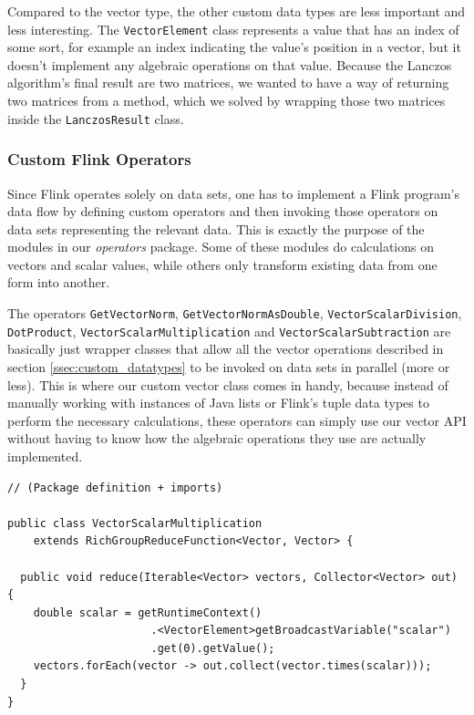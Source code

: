 
Compared to the vector type, the other custom data types are less important and
less interesting. The \texttt{VectorElement} class represents a value that has
an index of some sort, for example an index indicating the value's position in
a vector, but it doesn't implement any algebraic operations on that value.
Because the Lanczos algorithm's final result are two matrices, we wanted to
have a way of returning two matrices from a method, which we solved by wrapping
those two matrices inside the \texttt{LanczosResult} class.


\subsubsection{Custom Flink Operators}
\label{ssec:custom_operators}

Since Flink operates solely on data sets, one has to implement a Flink
program's data flow by defining custom operators and then invoking those
operators on data sets representing the relevant data. This is exactly the
purpose of the modules in our \textit{operators} package. Some of these modules
do calculations on vectors and scalar values, while others only transform
existing data from one form into another.

The operators \texttt{GetVectorNorm}, \texttt{GetVectorNormAsDouble},
\texttt{VectorScalarDivision}, \texttt{DotProduct},
\texttt{VectorScalarMultiplication} and \texttt{VectorScalarSubtraction} are
basically just wrapper classes that allow all the vector operations described
in section \ref{ssec:custom_datatypes} to be invoked on data sets in parallel
(more or less). This is where our custom vector class comes in handy, because
instead of manually working with instances of Java lists or Flink's tuple data
types to perform the necessary calculations, these operators can simply use our
vector API without having to know how the algebraic operations they use are
actually implemented.

\begin{lstlisting}[label=lst:vector_scalar_multiplication,captionpos=b,caption
=Implementation of the custom operator for vector-scalar multiplication]
// (Package definition + imports)

public class VectorScalarMultiplication
    extends RichGroupReduceFunction<Vector, Vector> {
    
  public void reduce(Iterable<Vector> vectors, Collector<Vector> out) {
    double scalar = getRuntimeContext()
                      .<VectorElement>getBroadcastVariable("scalar")
                      .get(0).getValue();
    vectors.forEach(vector -> out.collect(vector.times(scalar)));
  }
}
\end{lstlisting}

